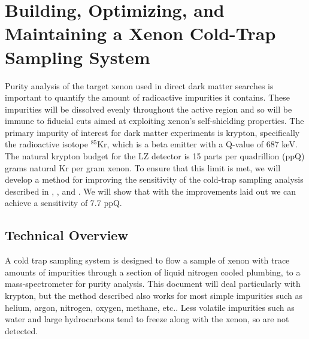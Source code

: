 \chapter{Building, Optimizing, and Maintaining a Xenon Cold-Trap Sampling System} \label{chap:sampling}
Purity analysis of the target xenon used in direct dark matter searches is important to quantify the amount of radioactive impurities it contains. These impurities will be dissolved evenly throughout the active region and so will be immune to fiducial cuts aimed at exploiting xenon's self-shielding properties. The primary impurity of interest for dark matter experiments is krypton, specifically the radioactive isotope $^{85}$Kr, which is a beta emitter with a Q-value of 687 keV. The natural krypton budget for the LZ detector is 15 parts per quadrillion (ppQ) grams natural Kr per gram xenon. To ensure that this limit is met, we will develop a method for improving the sensitivity of the cold-trap sampling analysis described in \cite{sampling_doug}, \cite{sampling_EXO}, and \cite{sampling_dm}. We will show that with the improvements laid out we can achieve a sensitivity of 7.7 ppQ.

\section{Technical Overview}
A cold trap sampling system is designed to flow a sample of xenon with trace amounts of impurities through a section of liquid nitrogen cooled plumbing, to a mass-spectrometer for purity analysis. This document will deal particularly with krypton, but the method described also works for most simple impurities  such as helium, argon, nitrogen, oxygen, methane, etc.. Less volatile impurities such as water and large hydrocarbons tend to freeze along with the xenon, so are not detected. 

